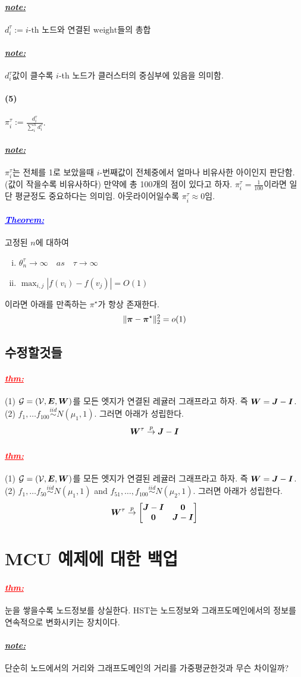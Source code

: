 \documentclass[12pt,oneside,english,a4paper]{article}
\def\note{\paragraph{\LARGE\textit{\underline{note:}}}\LARGE}
\newcommand{\parablue}[1]{\paragraph{\LARGE\textcolor{blue}{\it\underline{\textbf{#1:}}}}\LARGE}
\newcommand{\parared}[1]{\paragraph{\LARGE\textcolor{red}{\it\underline{\textbf{#1:}}}}\LARGE}
\def\five{\paragraph{\LARGE(5)}\LARGE}
\newcommand{\bs}[1]{\mbox{\boldmath $#1$}}
\newcommand{\bsE}{\mbox{\boldmath $E$}}
\newcommand{\bsI}{\mbox{\boldmath $I$}}
\newcommand{\bsJ}{\mbox{\boldmath $J$}}
\newcommand{\bsW}{\mbox{\boldmath $W$}}
\begin{document}
\note $d_i^{\tau}:=\mbox{$i$-th 노드와 연결된 weight들의 총합}$
\note $d_i^{\tau}$값이 클수록 $i$-th 노드가 클러스터의 중심부에 있음을 의미함. 

\five $\pi_i^{\tau}:=\frac{d_i^{\tau}}{\sum_{i}^nd_i^{\tau}}$.


\note $\pi_i^{\tau}$는 전체를 1로 보았을때 $i$-번째값이 전체중에서 얼마나 비유사한 아이인지 판단함. (값이 작을수록 비유사하다) 만약에 총 100개의 점이 있다고 하자. $\pi_i^{\tau}=\frac{1}{100}$이라면 일단 평균정도 중요하다는 의미임. 아웃라이어일수록 $\pi_i^{\tau}\approx 0$임. 

\parablue{Theorem} 고정된 $n$에 대하여 
\begin{enumerate}[(i)]
\item $\theta_n^{\tau} \to \infty\quad as\quad \tau \to \infty$
\item $\max_{i,j}|f(v_i)-f(v_j)|=O(1)$
\end{enumerate}
이라면 아래를 만족하는 $\pi^{\star}$가 항상 존재한다. 
\[
\|\bs{\pi}-\bs{\pi}^{\star}\|_2^2=o(1)
\]

\subsection{수정할것들}
\parared{thm} (1) $\cal G=(V,\bsE,\bsW)$를 모든 엣지가 연결된 레귤러 그래프라고 하자. 즉 $\bsW=\bsJ-\bsI$. (2) $f_1,\dots f_{100} \overset{iid}{\sim} N(\mu_1,1)$. 그러면 아래가 성립한다. 
\[
\bsW^{\tau} \overset{p}{\to} \bsJ-\bsI
\]

\parared{thm} (1) $\cal G=(V,\bsE,\bsW)$를 모든 엣지가 연결된 레귤러 그래프라고 하자. 즉 $\bsW=\bsJ-\bsI$. (2) $f_1,\dots f_{50} \overset{iid}{\sim} N(\mu_1,1)$ and $f_{51},\dots,f_{100} \overset{iid}{\sim} N(\mu_2,1)$. 그러면 아래가 성립한다. 
\[
\bsW^{\tau} \overset{p}{\to} \begin{bmatrix}\bsJ-\bsI & \bf{0} \\ \bf{0} & \bsJ-\bsI \end{bmatrix}
\]

\section{MCU 예제에 대한 백업}
\parared{thm} 눈을 쌓을수록 노드정보를 상실한다. HST는 노드정보와 그래프도메인에서의 정보를 연속적으로 변화시키는 장치이다. 
\note 단순히 노드에서의 거리와 그래프도메인의 거리를 가중평균한것과 무슨 차이일까? 
\end{document}
